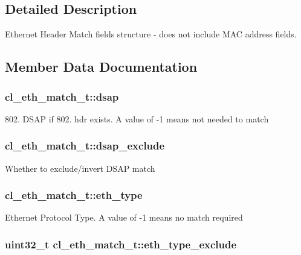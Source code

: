 \subsection{Detailed Description}
Ethernet Header Match fields structure -\/ does not include M\-A\-C address fields. 

\subsection{Member Data Documentation}
\hypertarget{structcl__eth__match__t_a003c22e665dee4d5c3db4d94505b5b4c}{
\subsubsection[{dsap}]{ cl\-\_\-eth\-\_\-match\-\_\-t\-::dsap}}\label{structcl__eth__match__t_a003c22e665dee4d5c3db4d94505b5b4c}
802. D\-S\-A\-P if 802. hdr exists. A value of -\/1 means not needed to match \hypertarget{structcl__eth__match__t_a52ecb236f565b9ec088e0e917bf425f3}{
\subsubsection[{dsap\-\_\-exclude}]{ cl\-\_\-eth\-\_\-match\-\_\-t\-::dsap\-\_\-exclude}}\label{structcl__eth__match__t_a52ecb236f565b9ec088e0e917bf425f3}
Whether to exclude/invert D\-S\-A\-P match \hypertarget{structcl__eth__match__t_ae43f837598b60d97a57d81de1cb4b229}{
\subsubsection[{eth\-\_\-type}]{ cl\-\_\-eth\-\_\-match\-\_\-t\-::eth\-\_\-type}}\label{structcl__eth__match__t_ae43f837598b60d97a57d81de1cb4b229}
Ethernet Protocol Type. A value of -\/1 means no match required \hypertarget{structcl__eth__match__t_a94740ba14b1c385c4cd0c09d80eaa0b5}{
\subsubsection[{eth\-\_\-type\-\_\-exclude}]{\setlength{\rightskip}{0pt plus 5cm}uint32\-\_\-t cl\-\_\-eth\-\_\-match\-\_\-t\-::eth\-\_\-type\-\_\-exclude}}\label{structcl__eth__match__t_a94740ba14b1c385c4cd0c09d80eaa0b5}

